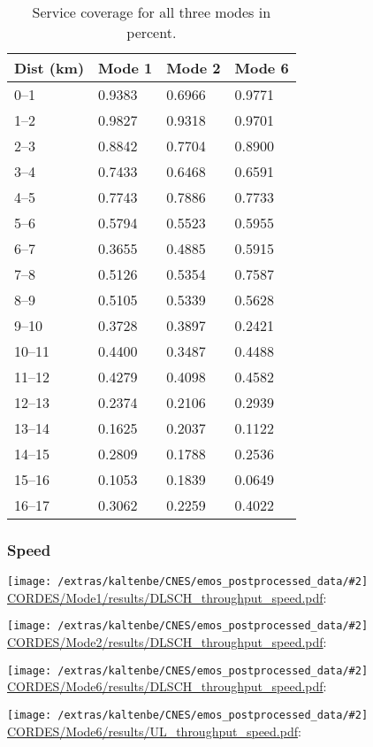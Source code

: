 \documentclass[a4paper,10pt]{article}
\newcommand{\printfile}[2][]{
 \begin{minipage}{8cm}
  \centering
  \texttt{[image: /extras/kaltenbe/CNES/emos\_postprocessed\_data/\#2]}
  \url{#2}: #1

 \end{minipage}
}
\begin{document}
\begin{table}
\centering
\begin{tabular}{l|l|l|l}
Dist (km) & Mode 1 & Mode 2 & Mode 6\\
\hline
0--1 &   0.9383 &   0.6966 &   0.9771\\
1--2 &   0.9827 &   0.9318 &   0.9701\\
2--3 &   0.8842 &   0.7704 &   0.8900\\
3--4 &   0.7433 &   0.6468 &   0.6591\\
4--5 &   0.7743 &   0.7886 &   0.7733\\
5--6 &   0.5794 &   0.5523 &   0.5955\\
6--7 &   0.3655 &   0.4885 &   0.5915\\
7--8 &   0.5126 &   0.5354 &   0.7587\\
8--9 &   0.5105 &   0.5339 &   0.5628\\
9--10 &    0.3728 &   0.3897 &   0.2421\\
10--11 &   0.4400 &   0.3487 &   0.4488\\
11--12 &   0.4279 &   0.4098 &   0.4582\\
12--13 &   0.2374 &   0.2106 &   0.2939\\
13--14 &   0.1625 &   0.2037 &   0.1122\\
14--15 &   0.2809 &   0.1788 &   0.2536\\
15--16 &   0.1053 &   0.1839 &   0.0649\\
16--17 &   0.3062 &   0.2259 &   0.4022\\
\end{tabular}
\caption{Service coverage for all three modes in percent.}
\end{table}

\subsubsection{Speed}

\printfile{CORDES/Mode1/results/DLSCH_throughput_speed.pdf}
\printfile{CORDES/Mode2/results/DLSCH_throughput_speed.pdf}

\printfile{CORDES/Mode6/results/DLSCH_throughput_speed.pdf}
\printfile{CORDES/Mode6/results/UL_throughput_speed.pdf}
\end{document}
